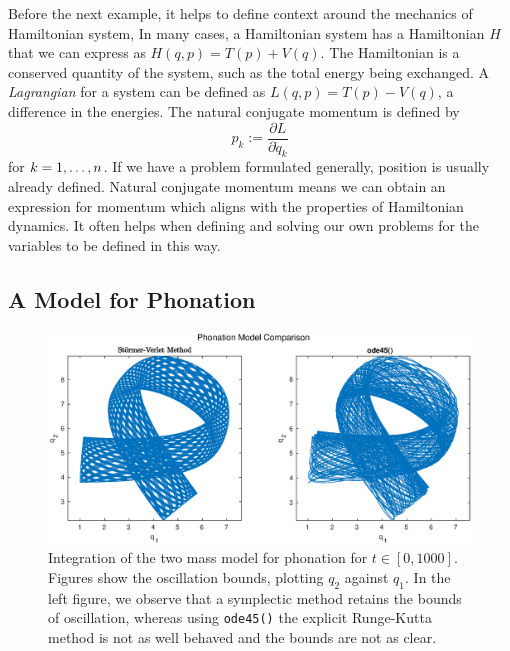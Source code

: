 Before the next example, it helps to define context around the mechanics of Hamiltonian system,
In many cases, a Hamiltonian system has a Hamiltonian $H$ that we can express as $H(q,p) = T(p) + V(q)$.
The Hamiltonian is a conserved quantity of the system, such as the total energy being exchanged.
A \textit{Lagrangian} for a system can be defined as $L(q,p) = T(p) - V(q)$,
a difference in the energies.
The natural conjugate momentum is defined by
\begin{equation}
	p_k := \dfrac{\partial L}{\partial \dot{q}_k}
\end{equation}
for $k = 1,\mathellipsis,n$.
If we have a problem formulated generally, position is usually already defined.
Natural conjugate momentum means we can obtain an expression for momentum which aligns with the properties of Hamiltonian dynamics.
It often helps when defining and solving our own problems for the variables to be defined in this way.

\subsection{A Model for Phonation}


\begin{figure}
	\centering
	\includegraphics[width = \linewidth]{figures/phonationcomp.eps}
	\caption{
		Integration of the two mass model for phonation for $t \in [0, 1000]$.
		Figures show the oscillation bounds, plotting $q_2$ against $q_1$.
		In the left figure, we observe that a symplectic method retains the bounds of oscillation,
		whereas using \texttt{ode45()} the explicit Runge-Kutta method is not as well behaved and the bounds are not as clear. 
	}
	\label{fig:phon}
\end{figure}

